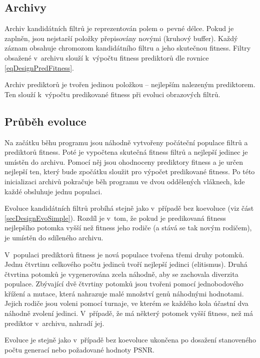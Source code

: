 \subsection{Archivy}

Archiv kandidátních filtrů je reprezentován polem o~pevné délce. Pokud je zaplněn, jsou nejstarší položky přepisovány novými (kruhový buffer). Každý záznam obsahuje chromozom kandidátního filtru a jeho skutečnou fitness. Filtry obsažené v~archivu slouží k~výpočtu fitness prediktorů dle rovnice \ref{eqDesignPredFitness}.

Archiv prediktorů je tvořen jedinou položkou -- nejlepším nalezeným prediktorem. Ten slouží k~výpočtu predikované fitness při evoluci obrazových filtrů.

\subsection{Průběh evoluce}

Na začátku běhu programu jsou náhodně vytvořeny počáteční populace filtrů a prediktorů fitness. Poté je vypočtena skutečná fitness filtrů a nejlepší jedinec je umístěn do archivu. Pomocí něj jsou ohodnoceny prediktory fitness a je určen nejlepší ten, který bude zpočátku sloužit pro výpočet predikované fitness. Po této inicializaci archivů pokračuje běh programu ve dvou oddělených vláknech, kde každé obsluhuje jednu populaci.

Evoluce kandidátních filtrů probíhá stejně jako v~případě bez koevoluce (viz část \ref{secDesignEvoSimple}). Rozdíl je v~tom, že pokud je predikovaná fitness nejlepšího potomka vyšší než fitness jeho rodiče (a stává se tak novým rodičem), je umístěn do sdíleného archivu.

V~populaci prediktorů fitness je nová populace tvořena třemi druhy potomků. Jednu čtvrtinu celkového počtu jedinců tvoří nejlepší jedinci (elitismus). Druhá čtvrtina potomků je vygenerována zcela náhodně, aby se zachovala diverzita populace. Zbývající dvě čtvrtiny potomků jsou tvořeni pomocí jednobodového křížení a mutace, která nahrazuje malé množství genů náhodnými hodnotami. Jejich rodiče jsou voleni pomocí turnaje, ve kterém se každého kola účastní dva náhodně zvolení jedinci. V~případě, že má některý potomek vyšší fitness, než má prediktor v~archivu, nahradí jej.

Evoluce je stejně jako v~případě bez koevoluce ukončena po dosažení stanoveného počtu generací nebo požadované hodnoty PSNR.




